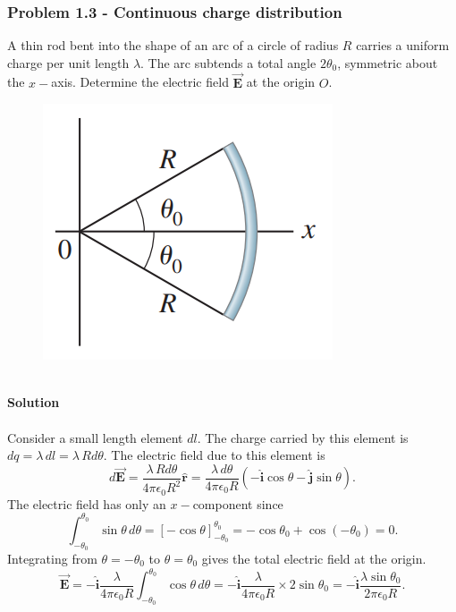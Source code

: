 \documentclass{article}
\begin{document}
\subsubsection*{Problem 1.3 - Continuous charge distribution}
A thin rod bent into the shape of an arc of a circle of radius $R$ carries a uniform charge per unit length $\lambda$. The arc subtends a total angle $2\theta_0$, symmetric about the $x-$axis. Determine the electric field $\Vec{\boldsymbol{E}}$ at the origin $O$.
\begin{figure}[h]
        \centering
        \includegraphics[width=0.25\linewidth]{figs/fig_prob_1.3.png}
    \end{figure}
\\\textbf{Solution}
\\
\\Consider a small length element $dl$. The charge carried by this element is $dq=\lambda\,dl=\lambda\,Rd\theta$. The electric field due to this element is
\[d\Vec{\boldsymbol{E}}=\frac{\lambda\,Rd\theta}{4\pi\epsilon_0R^2}\boldsymbol{\hat{r}}=\frac{\lambda\,d\theta}{4\pi\epsilon_0R}(-\boldsymbol{\hat{i}}\cos\theta-\boldsymbol{\hat{j}}\sin\theta).\]
The electric field has only an $x-$component since
\[\int_{-\theta_0}^{\theta_0}\sin\theta\,d\theta=\left[-\cos\theta\right]_{-\theta_0}^{\theta_0}=-\cos\theta_0+\cos(-\theta_0)=0.\]
Integrating from $\theta=-\theta_0$ to $\theta=\theta_0$ gives the total electric field at the origin.
\[\Vec{\boldsymbol{E}}=-\boldsymbol{\hat{i}}\frac{\lambda}{4\pi\epsilon_0R}\int_{-\theta_0}^{\theta_0}\cos\theta\,d\theta=-\boldsymbol{\hat{i}}\frac{\lambda}{4\pi\epsilon_0R}\times2\sin\theta_0=-\boldsymbol{\hat{i}}\frac{\lambda\sin\theta_0}{2\pi\epsilon_0R}.\]
\end{document}
